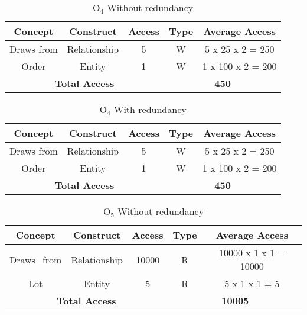 \begin{table}[!h]\caption{	$ \textrm{O}_\textrm{4} $ Without redundancy }
	\begin{center}
		\begin{tabular}{| c | c | c | c | c |}
			\hline
			\textbf{Concept} & \textbf{Construct} & \textbf{Access} & \textbf{Type} & \textbf{Average Access} \\ \hline
			Draws from & Relationship & 5 & W & 5 x 25 x 2 = 250 \\ \hline
			Order & Entity & 1 & W & 1 x 100 x 2 = 200 \\ \hline
			\multicolumn{3}{|c|}{\textbf{Total Access}} & \multicolumn{2}{|c|}{\textbf{450}} \\ \hline
		\end{tabular}
	\end{center}
\end{table}
\begin{table}[!h]\caption{	$ \textrm{O}_\textrm{4} $ With redundancy }
	\begin{center}
		\begin{tabular}{| c | c | c | c | c |}
			\hline
			\textbf{Concept} & \textbf{Construct} & \textbf{Access} & \textbf{Type} & \textbf{Average Access} \\ \hline
			Draws from & Relationship & 5 & W & 5 x 25 x 2 = 250 \\ \hline
			Order & Entity & 1 & W & 1 x 100 x 2 = 200 \\ \hline
			\multicolumn{3}{|c|}{\textbf{Total Access}} & \multicolumn{2}{|c|}{\textbf{450}} \\ \hline
		\end{tabular}
	\end{center}
\end{table}
\begin{table}[!h]\caption{	$ \textrm{O}_\textrm{5} $ Without redundancy }
	\begin{center}
		\begin{tabular}{| c | c | c | c | c |}
			\hline
			\textbf{Concept} & \textbf{Construct} & \textbf{Access} & \textbf{Type} & \textbf{Average Access} \\ \hline
			Draws\_from & Relationship & 10000 & R & 10000 x 1 x 1 = 10000 \\ \hline
			Lot & Entity &  5 & R & 5 x 1 x 1 = 5 \\ \hline
			\multicolumn{3}{|c|}{\textbf{Total Access}} & \multicolumn{2}{|c|}{\textbf{10005}} \\ \hline
		\end{tabular}
	\end{center}
\end{table}
